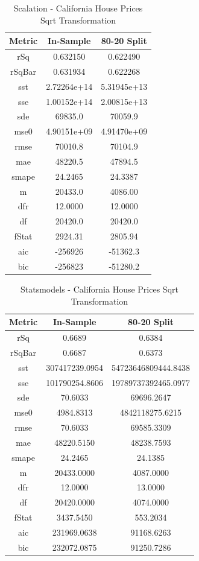 \documentclass{article}
\begin{document}
\begin{table}[H]
\centering
\caption{Scalation - California House Prices Sqrt Transformation}
\label{tab:Scalation - House Prices Sqrt Transformation}
\begin{tabular}{|c|c|c|} \hline 
Metric & In-Sample & 80-20 Split \\ \hline \hline 
rSq &0.632150 & 0.622490 \\ \hline 
rSqBar &0.631934 &      0.622268 \\ \hline 
sst &2.72264e+14 &      5.31945e+13 \\ \hline 
sse &1.00152e+14 &      2.00815e+13 \\ \hline 
sde &69835.0 &  70059.9 \\ \hline 
mse0 &4.90151e+09 &     4.91470e+09 \\ \hline 
rmse &70010.8 & 70104.9 \\ \hline 
mae &48220.5 &  47894.5 \\ \hline 
smape &24.2465 &        24.3387 \\ \hline 
m &20433.0 &    4086.00 \\ \hline 
dfr &12.0000 &  12.0000 \\ \hline 
df &20420.0 &   20420.0 \\ \hline 
fStat &2924.31 &        2805.94 \\ \hline 
aic &-256926 &  -51362.3 \\ \hline 
bic &-256823 &  -51280.2 \\ \hline 
\end{tabular}
\end{table}

\begin{table}[H]
\centering
\caption{Statsmodels - California House Prices Sqrt Transformation}
\label{tab:Statsmodels - House Prices Sqrt Transformation}
\begin{tabular}{|c|c|c|}\hline
Metric & In-Sample & 80-20 Split \\ \hline \hline
rSq & 0.6689 & 0.6384 \\ \hline
rSqBar & 0.6687 & 0.6373 \\ \hline
sst & 307417239.0954 & 54723646809444.8438 \\ \hline
sse & 101790254.8606 & 19789737392465.0977 \\ \hline
sde & 70.6033 & 69696.2647 \\ \hline
mse0 & 4984.8313 & 4842118275.6215 \\ \hline
rmse & 70.6033 & 69585.3309 \\ \hline
mae & 48220.5150 & 48238.7593 \\ \hline
smape & 24.2465 & 24.1385 \\ \hline
m & 20433.0000 & 4087.0000 \\ \hline
dfr & 12.0000 & 13.0000 \\ \hline
df & 20420.0000 & 4074.0000 \\ \hline
fStat & 3437.5450 & 553.2034 \\ \hline
aic & 231969.0638 & 91168.6263 \\ \hline
bic & 232072.0875 & 91250.7286 \\ \hline
\end{tabular}
\end{table}
\end{document}
